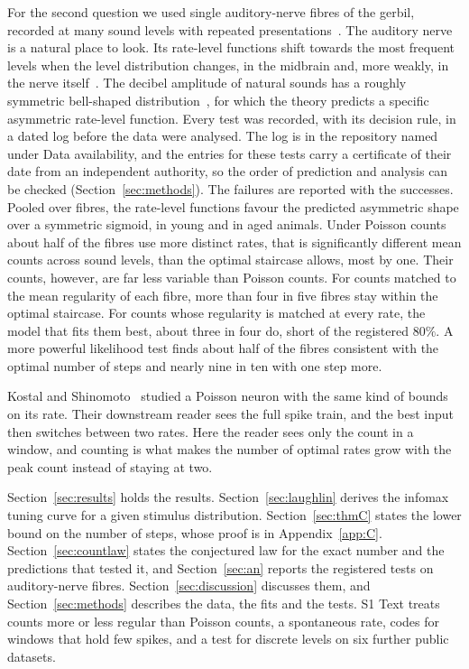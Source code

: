 \documentclass[10pt,letterpaper]{article}
\begin{document}
For the second question we used single auditory-nerve fibres of the gerbil, recorded at many sound levels with repeated
presentations~\cite{Heeringa2024}. The auditory nerve is a natural place to look. Its rate-level functions shift towards the most
frequent levels when the level distribution changes, in the midbrain and, more weakly, in the nerve itself~\cite{Wen2009}. The
decibel amplitude of natural sounds has a roughly symmetric bell-shaped distribution~\cite{Escabi2003}, for which the theory predicts a
specific asymmetric rate-level function. Every test was recorded, with its decision rule, in a dated log before the data were analysed.
The log is in the repository named under Data availability, and the entries for these tests carry a certificate of their date
from an independent authority, so the order of prediction and analysis can be checked (Section~\ref{sec:methods}). The failures are
reported with the successes. Pooled over fibres, the rate-level functions favour the predicted asymmetric shape over a symmetric sigmoid, in young and in aged animals.
Under Poisson counts about half of the fibres use more distinct rates, that is significantly different mean counts across sound
levels, than the optimal staircase allows, most by one. Their counts, however, are far less variable than
Poisson counts. For counts matched to the mean regularity of each fibre, more than four in five fibres stay within the optimal
staircase. For counts whose regularity is matched at every rate, the model that fits them best, about three in four do, short of the
registered $80\%$. A more powerful likelihood test finds about half of the fibres consistent with the optimal number of steps and nearly nine in ten
with one step more.

Kostal and Shinomoto~\cite{KostalShinomoto2016} studied a Poisson neuron with the same kind of bounds on its rate. Their downstream
reader sees the full spike train, and the best input then switches between two rates. Here the reader sees only the count in a
window, and counting is what makes the number of optimal rates grow with the peak count instead of staying at two.

Section~\ref{sec:results} holds the results. Section~\ref{sec:laughlin} derives the infomax tuning curve for a given stimulus
distribution. Section~\ref{sec:thmC} states the lower bound on the number of steps, whose proof is in Appendix~\ref{app:C}.
Section~\ref{sec:countlaw} states the conjectured law for the exact number and the predictions that tested it, and Section~\ref{sec:an}
reports the registered tests on auditory-nerve fibres. Section~\ref{sec:discussion} discusses them, and Section~\ref{sec:methods}
describes the data, the fits and the tests. S1 Text treats counts more or less regular than Poisson counts, a
spontaneous rate, codes for windows that hold few spikes, and a test for discrete levels on six further public datasets.
\end{document}
